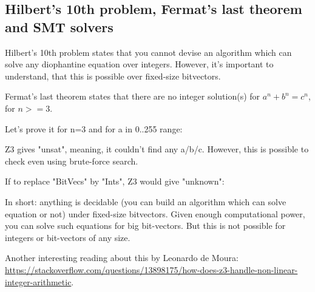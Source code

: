 \subsection{Hilbert's 10th problem, Fermat’s last theorem and SMT solvers}

\renewcommand{\CURPATH}{other/Hilbert_10}

Hilbert's 10th problem states that you cannot devise an algorithm which can solve any diophantine equation over integers.
However, it's important to understand, that this is possible over fixed-size bitvectors.

Fermat's last theorem states that there are no integer solution(s) for $a^n + b^n = c^n$, for $n>=3$.

Let's prove it for n=3 and for a in 0..255 range:



Z3 gives "unsat", meaning, it couldn't find any a/b/c.
However, this is possible to check even using brute-force search.

If to replace "BitVecs" by "Ints", Z3 would give "unknown":



In short: anything is decidable (you can build an algorithm which can solve equation or not) under fixed-size bitvectors.
Given enough computational power, you can solve such equations for big bit-vectors.
But this is not possible for integers or bit-vectors of any size.

Another interesting reading about this by Leonardo de Moura:
\url{https://stackoverflow.com/questions/13898175/how-does-z3-handle-non-linear-integer-arithmetic}.

